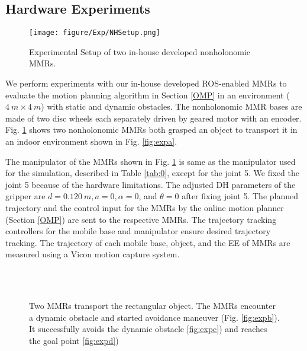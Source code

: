 \subsection{Hardware Experiments}
\begin{figure}[htbp]
	\centerline{\texttt{[image: figure/Exp/NHSetup.png]}}
	\caption{Experimental Setup of two in-house developed nonholonomic MMRs.}
	\label{fig:NonHoloSetup}
\end{figure}

We perform experiments with our in-house developed ROS-enabled MMRs to evaluate the motion planning algorithm in Section \ref{OMP} in an environment ($4\ m\times4\ m$) with static and dynamic obstacles. The nonholonomic MMR bases are made of two disc wheels each separately driven by geared motor with an encoder. Fig. \ref{fig:NonHoloSetup} shows two nonholonomic MMRs both grasped an object to transport it in an indoor environment shown in Fig. \ref{fig:expa}.

The manipulator of the MMRs shown in Fig. \ref{fig:NonHoloSetup} is same as the manipulator used for the simulation, described in Table \ref{tab:0}, except for the joint 5. We fixed the joint 5 because of the hardware limitations. The adjusted DH parameters of the gripper are $d = 0.120\ m, a = 0, \alpha = 0$, and $\theta = 0$ after fixing joint 5.
The planned trajectory and the control input for the MMRs by the online motion planner (Section \ref{OMP}) are sent to the respective MMRs. The trajectory tracking controllers for the mobile base and manipulator ensure desired trajectory tracking. The trajectory of each mobile base, object, and the EE of MMRs are measured using a Vicon motion capture system.

\begin{figure}[htbp]
	\\
	\\
	\caption{Two MMRs transport the rectangular object. The MMRs encounter a dynamic obstacle and started avoidance maneuver (Fig. \ref{fig:expb}). It successfully avoids the dynamic obstacle \ref{fig:expc}) and reaches the goal point \ref{fig:expd})}
	\label{fig:ExpSnap}
\end{figure}

